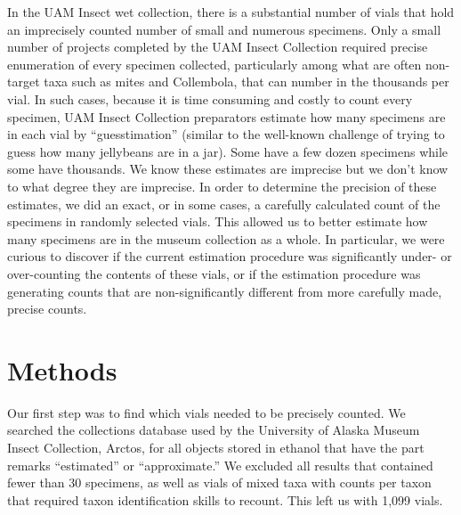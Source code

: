 \begin{multicols}{2}
In the UAM Insect wet collection, there is a substantial number of vials that hold an imprecisely counted number of small and numerous specimens. Only a small number of projects completed by the UAM Insect Collection required precise enumeration of every specimen collected, particularly among what are often non-target taxa such as mites and Collembola, that can number in the thousands per vial. In such cases, because it is time consuming and costly to count every specimen, UAM Insect Collection preparators estimate how many specimens are in each vial by “guesstimation” (similar to the well-known challenge of trying to guess how many jellybeans are in a jar). Some have a few dozen specimens while some have thousands. We know these estimates are imprecise but we don’t know to what degree they are imprecise. In order to determine the precision of these estimates, we did an exact, or in some cases, a carefully calculated count of the specimens in randomly selected vials. This allowed us to better estimate how many specimens are in the museum collection as a whole. In particular, we were curious to discover if the current estimation procedure was significantly under- or over-counting the contents of these vials, or if the estimation procedure was generating counts that are non-significantly different from more carefully made, precise counts. 

\section{Methods}
 
Our first step was to find which vials needed to be precisely counted. We searched the collections database used by the University of Alaska Museum Insect Collection, Arctos, for all objects stored in ethanol that have the part remarks ``estimated'' or ``approximate.'' We excluded all results that contained fewer than 30 specimens, as well as vials of mixed taxa with counts per taxon that required taxon identification skills to recount. This left us with 1,099 vials. 


\end{multicols}
